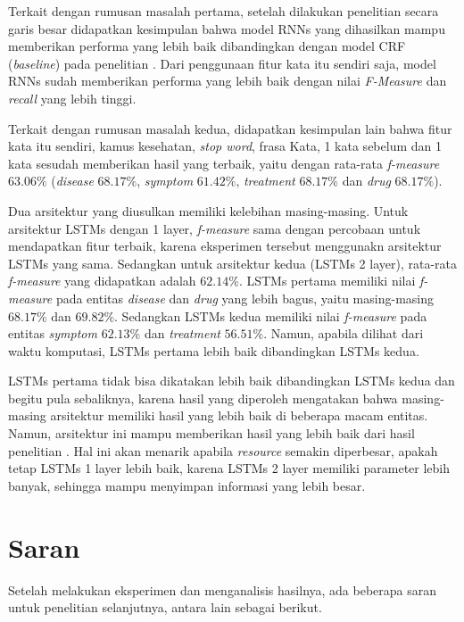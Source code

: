 Terkait dengan rumusan masalah pertama, setelah dilakukan penelitian secara garis besar didapatkan kesimpulan bahwa model RNNs yang dihasilkan mampu memberikan performa yang lebih baik dibandingkan dengan model CRF (\textit{baseline}) pada penelitian \cite{skripsiKakRadit}. Dari penggunaan fitur kata itu sendiri saja, model RNNs sudah memberikan performa yang lebih baik dengan nilai \textit{F-Measure} dan \textit{recall} yang lebih tinggi.

Terkait dengan rumusan masalah kedua, didapatkan kesimpulan lain bahwa fitur kata itu sendiri, kamus kesehatan, \textit{stop word}, frasa Kata,  1 kata sebelum dan 1 kata sesudah memberikan hasil yang terbaik, yaitu dengan rata-rata \textit{f-measure} $ 63.06\% $ (\textit{disease} $ 68.17\% $, \textit{symptom} $ 61.42\% $, \textit{treatment} $ 68.17\% $ dan \textit{drug} $ 68.17\% $).

Dua arsitektur yang diusulkan memiliki kelebihan masing-masing. Untuk arsitektur LSTMs dengan 1 layer, \textit{f-measure} sama dengan percobaan untuk mendapatkan fitur terbaik, karena eksperimen tersebut menggunakn arsitektur LSTMs yang sama. Sedangkan untuk arsitektur kedua (LSTMs 2 layer), rata-rata \textit{f-measure} yang didapatkan adalah $ 62.14\% $. LSTMs pertama memiliki nilai \textit{f-measure} pada entitas \textit{disease} dan \textit{drug} yang lebih bagus, yaitu masing-masing $ 68.17\% $ dan $ 69.82\% $. Sedangkan LSTMs kedua memiliki nilai \textit{f-measure} pada entitas \textit{symptom} $ 62.13\% $ dan \textit{treatment} $ 56.51\% $. Namun, apabila dilihat dari waktu komputasi, LSTMs pertama lebih baik dibandingkan LSTMs kedua.

LSTMs pertama tidak bisa dikatakan lebih baik dibandingkan LSTMs kedua dan begitu pula sebaliknya, karena hasil yang diperoleh mengatakan bahwa masing-masing arsitektur memiliki hasil yang lebih baik di beberapa macam entitas. Namun, arsitektur ini mampu memberikan hasil yang lebih baik dari hasil penelitian \cite{skripsiKakRadit}. Hal ini akan menarik apabila \textit{resource} semakin diperbesar, apakah tetap LSTMs 1 layer lebih baik, karena LSTMs 2 layer memiliki parameter lebih banyak, sehingga mampu menyimpan informasi yang lebih besar.

\section{Saran}
Setelah melakukan eksperimen dan menganalisis hasilnya, ada beberapa saran untuk penelitian selanjutnya, antara lain sebagai berikut.

